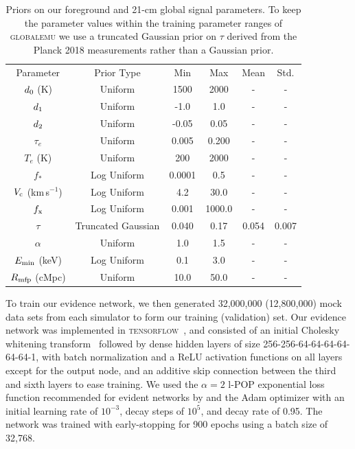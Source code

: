 \documentclass[twocolumn,english,aps,prd,amsmath,amssymb,reprint,floatfix,nofootinbib,showkeys]{revtex4-2}
\newif\ifhighlightchanges
\newcommand{\change}[1]{{\ifhighlightchanges\color{red} #1\else #1\fi}}
\begin{document}
\begin{table}
 \caption{Priors on our \change{foreground and} 21-cm global signal parameters. To keep the parameter values within the training parameter ranges of \textsc{globalemu} we use a truncated Gaussian prior on $\tau$ derived from the Planck 2018 measurements rather than a Gaussian prior.}
 \label{tab:priors}
 \begin{ruledtabular}
 \begin{tabular}{cccccc}
  Parameter & Prior Type & Min & Max & Mean & Std. \\
\colrule
  \change{$d_{\rm 0}$ (K)} &  \change{Uniform}  & \change{1500} & \change{2000} & \change{-} & \change{-} \\
  \change{$d_{\rm 1}$} &  \change{Uniform}  & \change{-1.0} & \change{1.0} & \change{-} & \change{-} \\
  \change{$d_{\rm 2}$} &  \change{Uniform}  & \change{-0.05} & \change{0.05} & \change{-} & \change{-} \\
  \change{$\tau_{e}$}  &  \change{Uniform}  & \change{0.005} & \change{0.200} & \change{-} & \change{-} \\
  \change{$T_{e}$ (K)}  &  \change{Uniform}  & \change{200} & \change{2000} & \change{-} & \change{-} \\
\colrule
  $f_{*}$ & Log Uniform & 0.0001 & 0.5 & - & - \\
  $V_{\rm c}$ (km\,s$^{-1}$) & Log Uniform & 4.2 & 30.0 & - & - \\
  $f_{\rm x}$ & Log Uniform & 0.001 & 1000.0 & - & - \\
  $\tau$ & Truncated Gaussian & 0.040 & 0.17 & 0.054 & 0.007 \\
  $\alpha$ & Uniform & 1.0 & 1.5 & - & - \\
  $E_{\rm min}$ (keV) & Log Uniform & 0.1 & 3.0 & - & - \\
  $R_{\rm mfp}$ (cMpc) & Uniform & 10.0 & 50.0 & - & - \\
 \end{tabular}
 \end{ruledtabular}
\end{table}


\change{To train our evidence network, we then} generated \change{32,000,000} (\change{12,800,000}) mock data sets from each simulator to form our training (validation) set.  
Our evidence network was implemented in \textsc{tensorflow}~\citep{tensorflow}, \change{and consisted of an initial Cholesky whitening transform~\citep{Kessy_2015} followed by dense hidden layers of size 256-256-64-64-64-64-64-64-1, with batch normalization and a ReLU activation functions on all layers except for the output node, and an additive skip connection between the third and sixth layers to ease training.
We used the $\alpha = 2$ l-POP exponential loss function recommended for evident networks by \citet{EN} and the Adam optimizer with an initial learning rate of $10^{-3}$, decay steps of $10^5$, and decay rate of 0.95.
}
The network was trained with early-stopping for \change{900} epochs using a batch size of \change{32,768}.
\end{document}

